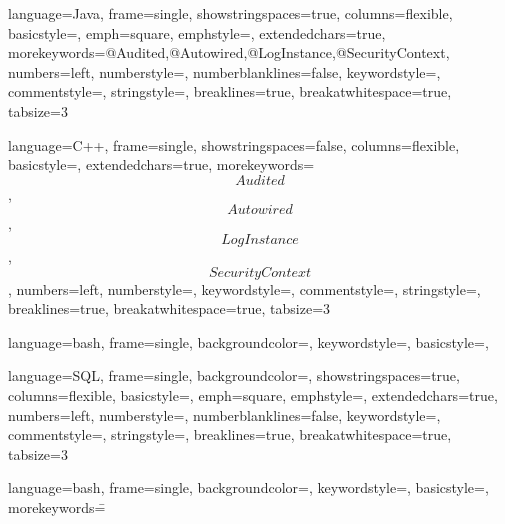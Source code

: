 

{
	language={Java},
	frame={single},
  showstringspaces={true},
  columns={flexible},
  basicstyle={\small\ttfamily},
	emph={square},
	emphstyle={\color{blue}},
	extendedchars={true},
	morekeywords={@Audited,@Autowired,@LogInstance,@SecurityContext},
	numbers={left},
  numberstyle={\tiny\color{gray}},
	numberblanklines={false},
  keywordstyle={\color{violet}},
  commentstyle={\color{dkgreen}},
  stringstyle={\color{blue}},
  breaklines={true},
  breakatwhitespace={true},
  tabsize={3}
}

{
	language={C++},
	frame={single},
  showstringspaces={false},
  columns={flexible},
  basicstyle={\small\ttfamily},
	extendedchars={true},
	morekeywords={\[Audited\],\[Autowired\],\[LogInstance\],\[SecurityContext\]},
	numbers={left},
  numberstyle={\tiny\color{gray}},
  keywordstyle={\color{violet}},
  commentstyle={\color{dkgreen}},
  stringstyle={\color{blue}},
  breaklines={true},
  breakatwhitespace={true},
  tabsize={3}
}

{	language=bash,
	frame=single,
	backgroundcolor=\color{lightgrey},
	keywordstyle=\color{blue},
	basicstyle=\ttfamily,
}

{
	language={SQL},
	frame={single},
	backgroundcolor=\color{lightblue},
  showstringspaces={true},
  columns={flexible},
  basicstyle={\small\ttfamily},
	emph={square},
	emphstyle={\color{blue}},
	extendedchars={true},
	numbers={left},
  numberstyle={\tiny\color{gray}},
	numberblanklines={false},
  keywordstyle={\color{violet}},
  commentstyle={\color{dkgreen}},
  stringstyle={\color{blue}},
  breaklines={true},
  breakatwhitespace={true},
  tabsize={3}
}

{	language=bash,
	frame=single,
	backgroundcolor=\color{white},
	keywordstyle=\color{blue},
	basicstyle=\ttfamily,
	morekeywords={\=}
}